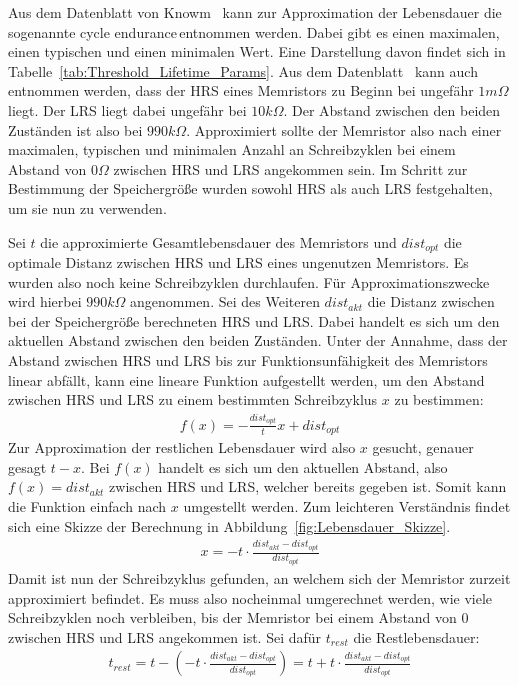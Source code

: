 Aus dem Datenblatt von Knowm~\cite{knowm_comp_2019} kann zur Approximation der Lebensdauer die sogenannte \glqq cycle endurance\grqq\,entnommen werden. Dabei gibt es einen maximalen, einen typischen und einen minimalen Wert. Eine Darstellung davon findet sich in Tabelle~\ref{tab:Threshold_Lifetime_Params}. Aus dem Datenblatt~\cite{knowm_comp_2019} kann auch entnommen werden, dass der HRS eines Memristors zu Beginn bei ungefähr $1m\Omega$ liegt. Der LRS liegt dabei ungefähr bei $10k\Omega$. Der Abstand zwischen den beiden Zuständen ist also bei $990k\Omega$. Approximiert sollte der Memristor also nach einer maximalen, typischen und minimalen Anzahl an Schreibzyklen bei einem Abstand von $0\Omega$ zwischen HRS und LRS angekommen sein. Im Schritt zur Bestimmung der Speichergröße wurden sowohl HRS als auch LRS festgehalten, um sie nun zu verwenden.


Sei $t$ die approximierte Gesamtlebensdauer des Memristors und $dist_{opt}$ die optimale Distanz zwischen HRS und LRS eines ungenutzen Memristors. Es wurden also noch keine Schreibzyklen durchlaufen. Für Approximationszwecke wird hierbei $990k\Omega$ angenommen. Sei des Weiteren $dist_{akt}$ die Distanz zwischen bei der Speichergröße berechneten HRS und LRS. Dabei handelt es sich um den aktuellen Abstand zwischen den beiden Zuständen. Unter der Annahme, dass der Abstand zwischen HRS und LRS bis zur Funktionsunfähigkeit des Memristors linear abfällt, kann eine lineare Funktion aufgestellt werden, um den Abstand zwischen HRS und LRS zu einem bestimmten Schreibzyklus $x$ zu bestimmen:
\begin{align}
  f(x) = -\frac{dist_{opt}}{t}x + dist_{opt}
\end{align}
Zur Approximation der restlichen Lebensdauer wird also $x$ gesucht, genauer gesagt $t-x$. Bei $f(x)$ handelt es sich um den aktuellen Abstand, also $f(x) = dist_{akt}$ zwischen HRS und LRS, welcher bereits gegeben ist. Somit kann die Funktion einfach nach $x$ umgestellt werden. Zum leichteren Verständnis findet sich eine Skizze der Berechnung in Abbildung~\ref{fig:Lebensdauer_Skizze}.
\begin{align}
  x = - t \cdot \frac{dist_{akt} - dist_{opt}}{dist_{opt}}
\end{align}
Damit ist nun der Schreibzyklus gefunden, an welchem sich der Memristor zurzeit approximiert befindet. Es muss also nocheinmal umgerechnet werden, wie viele Schreibzyklen noch verbleiben, bis der Memristor bei einem Abstand von 0 zwischen HRS und LRS angekommen ist. Sei dafür $t_{rest}$ die Restlebensdauer:
\begin{align}
  t_{rest} = t - ( - t \cdot \frac{dist_{akt} - dist_{opt}}{dist_{opt}}) = t + t \cdot \frac{dist_{akt} - dist_{opt}}{dist_{opt}}
\end{align}


